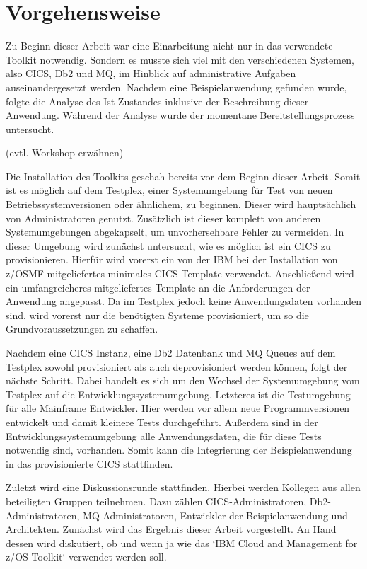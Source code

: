 \chapter{Vorgehensweise}\label{ch:vorgehensweise}
Zu Beginn dieser Arbeit war eine Einarbeitung nicht nur in das verwendete Toolkit notwendig.
Sondern es musste sich viel mit den verschiedenen Systemen, also CICS, Db2 und MQ, im Hinblick auf administrative Aufgaben auseinandergesetzt werden.
Nachdem eine Beispielanwendung gefunden wurde, folgte die Analyse des Ist-Zustandes inklusive der Beschreibung dieser Anwendung.
Während der Analyse wurde der momentane Bereitstellungsprozess untersucht.

(evtl. Workshop erwähnen)

Die Installation des Toolkits geschah bereits vor dem Beginn dieser Arbeit.
Somit ist es möglich auf dem Testplex, einer Systemumgebung für Test von neuen Betriebssystemversionen oder ähnlichem, zu beginnen.
Dieser wird hauptsächlich von Administratoren genutzt.
Zusätzlich ist dieser komplett von anderen Systemumgebungen abgekapselt, um unvorhersehbare Fehler zu vermeiden.
In dieser Umgebung wird zunächst untersucht, wie es möglich ist ein CICS zu provisionieren.
Hierfür wird vorerst ein von der IBM bei der Installation von z/OSMF mitgeliefertes minimales CICS Template verwendet.
Anschließend wird ein umfangreicheres mitgeliefertes Template an die Anforderungen der Anwendung angepasst.
Da im Testplex jedoch keine Anwendungsdaten vorhanden sind, wird vorerst nur die benötigten Systeme provisioniert, um so die Grundvoraussetzungen zu schaffen.

Nachdem eine CICS Instanz, eine Db2 Datenbank und MQ Queues auf dem Testplex sowohl provisioniert als auch deprovisioniert werden können, folgt der nächste Schritt.
Dabei handelt es sich um den Wechsel der Systemumgebung vom Testplex auf die Entwicklungssystemumgebung.
Letzteres ist die Testumgebung für alle Mainframe Entwickler.
Hier werden vor allem neue Programmversionen entwickelt und damit kleinere Tests durchgeführt.
Außerdem sind in der Entwicklungssystemumgebung alle Anwendungsdaten, die für diese Tests notwendig sind, vorhanden.
Somit kann die Integrierung der Beispielanwendung in das provisionierte CICS stattfinden.

Zuletzt wird eine Diskussionsrunde stattfinden.
Hierbei werden Kollegen aus allen beteiligten Gruppen teilnehmen.
Dazu zählen CICS-Administratoren, Db2-Administratoren, MQ-Administratoren, Entwickler der Beispielanwendung und Architekten.
Zunächst wird das Ergebnis dieser Arbeit vorgestellt.
An Hand dessen wird diskutiert, ob und wenn ja wie das `IBM Cloud and Management for z/OS Toolkit` verwendet werden soll.